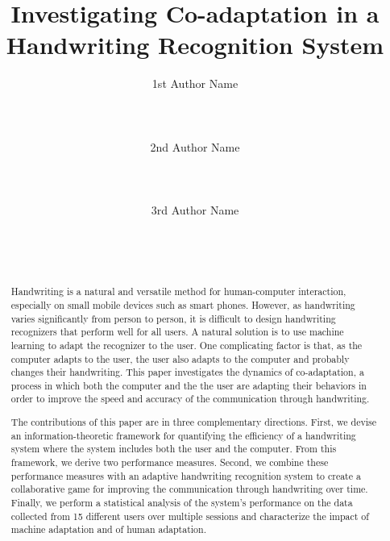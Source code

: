 \documentclass{sigchi}
\begin{document}
\title{Investigating Co-adaptation in a Handwriting Recognition System}

\author{
  \alignauthor 1st Author Name\\
    \\
    \\
    \\
  \alignauthor 2nd Author Name\\
    \\
    \\
    \\
  \alignauthor 3rd Author Name\\
    \\
    \\
    \\
}


\maketitle

\begin{abstract}
  Handwriting is a natural and versatile method for human-computer
  interaction, especially on small mobile devices such as smart
  phones. However, as handwriting varies significantly from person to
  person, it is difficult to design handwriting recognizers that
  perform well for all users. A natural solution is to use machine
  learning to adapt the recognizer to the user. One complicating
  factor is that, as the computer adapts to the user, the user also
  adapts to the computer and probably changes their handwriting. This
  paper investigates the dynamics of co-adaptation, a process in which
  both the computer and the the user are adapting their behaviors in
  order to improve the speed and accuracy of the communication through
  handwriting.

  The contributions of this paper are in three complementary
  directions. First, we devise an information-theoretic framework for
  quantifying the efficiency of a handwriting system where the system
  includes both the user and the computer. From this framework, we
  derive two performance measures. Second, we combine these
  performance measures with an adaptive handwriting recognition system
  to create a collaborative game for improving the communication
  through handwriting over time. Finally, we perform a statistical
  analysis of the system’s performance on the data collected from 15
  different users over multiple sessions and characterize the impact
  of machine adaptation and of human adaptation.
\end{abstract}
\end{document}
